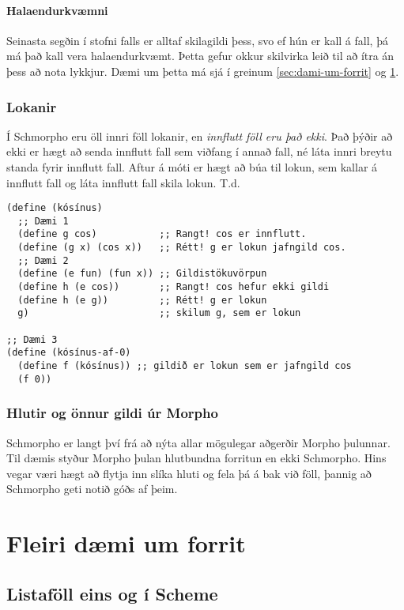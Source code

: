 \documentclass[a4paper,icelandic]{article}
\begin{document}
\paragraph{Halaendurkvæmni}
\label{sec:halaendurkvamni}

Seinasta segðin í stofni falls er alltaf skilagildi þess, svo ef hún
er kall á fall, þá má það kall vera halaendurkvæmt. Þetta gefur okkur
skilvirka leið til að ítra án þess að nota lykkjur. Dæmi um þetta má
sjá í greinum \ref{sec:dami-um-forrit} og \ref{sec:fleiri-dami-um}.

\subsubsection{Lokanir}
\label{sec:lokanir}
Í Schmorpho eru öll innri föll lokanir, en \emph{innflutt föll eru það
  ekki}.  Það þýðir að ekki er hægt að senda innflutt fall sem viðfang
í annað fall, né láta innri breytu standa fyrir innflutt fall. Aftur á
móti er hægt að búa til lokun, sem kallar á innflutt fall og láta
innflutt fall skila lokun. T.d.
\begin{verbatim}
(define (kósínus)
  ;; Dæmi 1
  (define g cos)           ;; Rangt! cos er innflutt.
  (define (g x) (cos x))   ;; Rétt! g er lokun jafngild cos.
  ;; Dæmi 2
  (define (e fun) (fun x)) ;; Gildistökuvörpun
  (define h (e cos))       ;; Rangt! cos hefur ekki gildi
  (define h (e g))         ;; Rétt! g er lokun
  g)                       ;; skilum g, sem er lokun

;; Dæmi 3
(define (kósínus-af-0) 
  (define f (kósínus)) ;; gildið er lokun sem er jafngild cos
  (f 0))
\end{verbatim}

\subsubsection{ Hlutir og önnur gildi úr Morpho}
\label{sec:hlutir-og-onnur}
Schmorpho er langt því frá að nýta allar mögulegar aðgerðir Morpho
þulunnar. Til dæmis styður Morpho þulan hlutbundna forritun en ekki
Schmorpho. Hins vegar væri hægt að flytja inn slíka hluti og fela þá á
bak við föll, þannig að Schmorpho geti notið góðs af þeim. 

\section{Fleiri dæmi um forrit}
\label{sec:fleiri-dami-um}

\subsection{Listaföll eins og í Scheme}
\label{sec:listafoll-eins-og}
\end{document}
